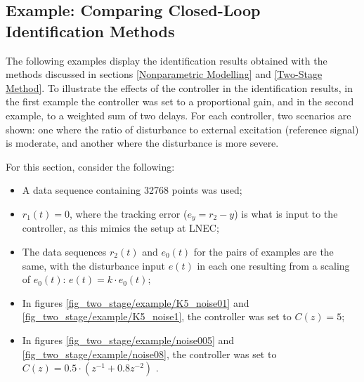 \documentclass[  10pt, twoside]{report} %
\numberwithin{equation}{chapter}
\begin{document}
\subsection{Example: Comparing Closed-Loop Identification Methods}

The following examples display the identification results obtained with the methods discussed in sections \ref{Nonparametric Modelling} and \ref{Two-Stage Method}. To illustrate the effects of the controller in the identification results, in the first example the controller was set to a proportional gain, and in the second example, to a weighted sum of two delays. For each controller, two scenarios are shown: one where the ratio of disturbance to external excitation (reference signal) is moderate, and another where the disturbance is more severe. 

For this section, consider the following:
\begin{itemize}
    \item A data sequence containing 32768 points was used;
    \item  $r_1(t) = 0$, where the tracking error ($e_y = r_2 - y$) is what is input to the controller, as this mimics the setup at LNEC;
    \item The data sequences $r_{2}(t)$ and $e_0(t)$ for the pairs of examples are the same, with the disturbance input $e(t)$ in each one resulting from a scaling of $e_0(t)$:  $e(t) = k \cdot e_0(t)$;
    \item In figures \ref{fig_two_stage/example/K5_noise01} and \ref{fig_two_stage/example/K5_noise1}, the controller was set to $C(z)=5$;
    \item In figures \ref{fig_two_stage/example/noise005} and \ref{fig_two_stage/example/noise08}, the controller was set to $C(z)=0.5 \cdot (z^{-1} + 0.8 z^{-2})$ .
\end{itemize}  
\end{document}
